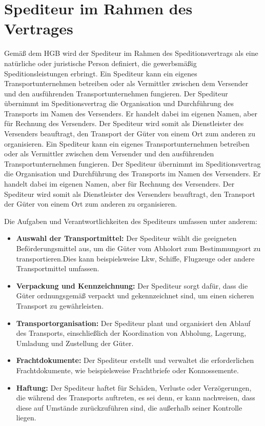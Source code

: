     \section{Spediteur im Rahmen des Vertrages}
    Gemäß dem HGB wird der Spediteur im Rahmen des Speditionsvertrags als eine natürliche oder juristische Person definiert, die gewerbsmäßig Speditionsleistungen erbringt. Ein Spediteur kann ein eigenes Transportunternehmen betreiben oder als Vermittler zwischen dem Versender und den ausführenden Transportunternehmen fungieren.
    Der Spediteur übernimmt im Speditionsvertrag die Organisation und Durchführung des Transports im Namen des Versenders.
    Er handelt dabei im eigenen Namen, aber für Rechnung des Versenders.
    Der Spediteur wird somit als Dienstleister des Versenders beauftragt, den Transport der Güter von einem Ort zum anderen zu organisieren.
    Ein Spediteur kann ein eigenes Transportunternehmen betreiben oder als Vermittler zwischen dem Versender und den ausführenden Transportunternehmen fungieren.
    Der Spediteur übernimmt im Speditionsvertrag die Organisation und Durchführung des Transports im Namen des Versenders. Er handelt dabei im eigenen Namen, aber für Rechnung des Versenders.
    Der Spediteur wird somit als Dienstleister des Versenders beauftragt, den Transport der Güter von einem Ort zum anderen zu organisieren.

    Die Aufgaben und Verantwortlichkeiten des Spediteurs umfassen unter anderem:\nl
    \begin{itemize}
        \item \textbf{Auswahl der Transportmittel:}  Der Spediteur wählt die geeigneten Beförderungsmittel aus, um die Güter vom Abholort zum Bestimmungsort zu transportieren.Dies kann beispielsweise Lkw, Schiffe, Flugzeuge oder andere Transportmittel umfassen.
        \item \textbf{Verpackung und Kennzeichnung:} Der Spediteur sorgt dafür, dass die Güter ordnungsgemäß verpackt und gekennzeichnet sind, um einen sicheren Transport zu gewährleisten.
        \item \textbf{Transportorganisation:} Der Spediteur plant und organisiert den Ablauf des Transports, einschließlich der Koordination von Abholung, Lagerung, Umladung und Zustellung der Güter.
        \item \textbf{Frachtdokumente:} Der Spediteur erstellt und verwaltet die erforderlichen Frachtdokumente, wie beispielsweise Frachtbriefe oder Konnossemente.
        \item \textbf{Haftung:} Der Spediteur haftet für Schäden, Verluste oder Verzögerungen, die während des Transports auftreten, es sei denn, er kann nachweisen, dass diese auf Umstände zurückzuführen sind, die außerhalb seiner Kontrolle liegen.
    \end{itemize}

